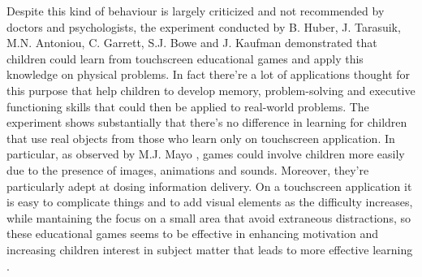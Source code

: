 Despite this kind of behaviour is largely criticized and not recommended by doctors and psychologists, the experiment conducted by B. Huber, J. Tarasuik, M.N. Antoniou, C. Garrett, S.J. Bowe and J. Kaufman \cite{Huber} demonstrated that children could learn from touchscreen educational games and apply this knowledge on physical problems. In fact there're a lot of applications thought for this purpose that help children to develop memory, problem-solving and executive functioning skills that could then be applied to real-world problems. The experiment shows substantially that there's no difference in learning for children that use real objects from those who learn only on touchscreen application. In particular, as observed by M.J. Mayo \cite{Mayo}, games could involve children more easily due to the presence of images, animations and sounds. Moreover, they're particularly adept at dosing information delivery. On a touchscreen application it is easy to complicate things and to add visual elements as the difficulty increases, while mantaining the focus on a small area that avoid extraneous distractions, so these educational games seems to be effective in enhancing motivation and increasing children interest in subject matter that leads to more effective learning \cite{Annetta}. 

